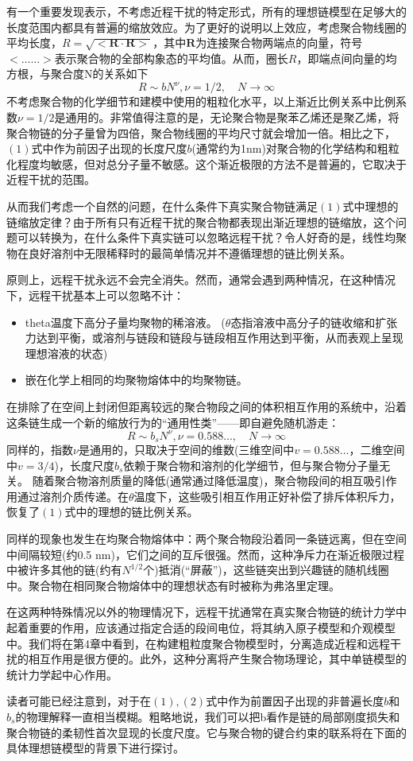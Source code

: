 有一个重要发现表示，不考虑近程干扰的特定形式，所有的理想链模型在足够大的长度范围内都具有普遍的缩放效应。为了更好的说明以上效应，考虑聚合物线圈的平均长度，$R=\sqrt{<\mathbf{R}\cdot \mathbf{R}>}$，其中$\mathbf{R}$为连接聚合物两端点的向量，符号$<……>$表示聚合物的全部构象态的平均值。从而，圈长$R$，即端点间向量的均方根，与聚合度N的关系如下
\begin{equation}
R \sim b N ^ { \nu } , \nu = 1 / 2 , \quad N \rightarrow \infty
\end{equation}
不考虑聚合物的化学细节和建模中使用的粗粒化水平，以上渐近比例关系中比例系数$\nu = 1/2$是通用的。非常值得注意的是，无论聚合物是聚苯乙烯还是聚乙烯，将聚合物链的分子量曾为四倍，聚合物线圈的平均尺寸就会增加一倍。相比之下，$(1)$式中作为前因子出现的长度尺度$b$(通常约为1nm)对聚合物的化学结构和粗粒化程度均敏感，但对总分子量不敏感。这个渐近极限的方法不是普遍的，它取决于近程干扰的范围。

从而我们考虑一个自然的问题，在什么条件下真实聚合物链满足$(1)$式中理想的链缩放定律？由于所有只有近程干扰的聚合物都表现出渐近理想的链缩放，这个问题可以转换为，在什么条件下真实链可以忽略远程干扰？令人好奇的是，线性均聚物在良好溶剂中无限稀释时的最简单情况并不遵循理想的链比例关系。

原则上，远程干扰永远不会完全消失。然而，通常会遇到两种情况，在这种情况下，远程干扰基本上可以忽略不计：
\begin{itemize}
	\item theta温度下高分子量均聚物的稀溶液。
	($\theta$态指溶液中高分子的链收缩和扩张力达到平衡，或溶剂与链段和链段与链段相互作用达到平衡，从而表观上呈现理想溶液的状态)
	\item 嵌在化学上相同的均聚物熔体中的均聚物链。
\end{itemize}

在排除了在空间上封闭但距离较远的聚合物段之间的体积相互作用的系统中，沿着这条链生成一个新的缩放行为的“通用性类”——即自避免随机游走：
\begin{equation}
R \sim b _ { s } N ^ { \nu } , \nu = 0.588 \ldots , \quad N \rightarrow \infty
\end{equation}
同样的，指数$\nu$是通用的，只取决于空间的维数(三维空间中$ v = 0.588 \dots$，二维空间中$ v =3/4 $)，长度尺度$b_s$依赖于聚合物和溶剂的化学细节，但与聚合物分子量无关。
随着聚合物溶剂质量的降低(通常通过降低温度)，聚合物段间的相互吸引作用通过溶剂介质传递。在$\theta$温度下，这些吸引相互作用正好补偿了排斥体积斥力，恢复了$(1)$式中的理想的链比例关系。

同样的现象也发生在均聚合物熔体中：两个聚合物段沿着同一条链远离，但在空间中间隔较短(约0.5 nm)，它们之间的互斥很强。然而，这种净斥力在渐近极限过程中被许多其他的链(约有$N^{1/2}$个)抵消(“屏蔽”)，这些链突出到兴趣链的随机线圈中。聚合物在相同聚合物熔体中的理想状态有时被称为弗洛里定理。

在这两种特殊情况以外的物理情况下，远程干扰通常在真实聚合物链的统计力学中起着重要的作用，应该通过指定合适的段间电位，将其纳入原子模型和介观模型中。我们将在第4章中看到，在构建粗粒度聚合物模型时，分离造成近程和远程干扰的相互作用是很方便的。此外，这种分离将产生聚合物场理论，其中单链模型的统计力学起中心作用。

读者可能已经注意到，对于在$(1),(2)$式中作为前置因子出现的非普遍长度$b$和$b_s$的物理解释一直相当模糊。粗略地说，我们可以把b看作是链的局部刚度损失和聚合物链的柔韧性首次显现的长度尺度。它与聚合物的键合约束的联系将在下面的具体理想链模型的背景下进行探讨。
